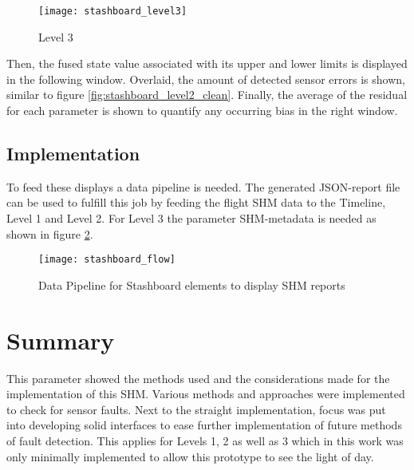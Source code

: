 \begin{figure}
    \centering
    \texttt{[image: stashboard\_level3]}
    \caption{Level 3}%
    \label{fig:stashboard_level3}
\end{figure}

Then, the fused state value associated with its upper and lower limits is displayed in the following window. Overlaid, the amount of detected sensor errors is shown, similar to figure \ref{fig:stashboard_level2_clean}. Finally, the average of the residual for each parameter is shown to quantify any occurring bias in the right window.


\subsection{Implementation}
To feed these displays a data pipeline is needed. The generated JSON-report file can be used to fulfill this job by feeding the flight SHM data to the Timeline, Level 1 and Level 2. For Level 3 the parameter SHM-metadata is needed as shown in figure \ref{fig:stashboard_flow}.

\begin{figure}[!h]
    \centering
    \texttt{[image: stashboard\_flow]}
    \caption{Data Pipeline for Stashboard elements to display SHM reports}
    \label{fig:stashboard_flow}
\end{figure}





\newpage
\section{Summary}

This parameter showed the methods used and the considerations made for the implementation of this SHM. Various methods and approaches were implemented to check for sensor faults. Next to the straight implementation, focus was put into developing solid interfaces to ease further implementation of future methods of fault detection. This applies for Levels 1, 2 as well as 3 which in this work was only minimally implemented to allow this prototype to see the light of day.





